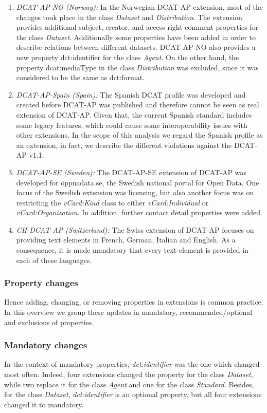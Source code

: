 \documentclass[<options>]{elsarticle}
\begin{document}
\begin{enumerate}
\item \textit{DCAT-AP-NO (Norway):} In the Norwegian DCAT-AP extension, most of the changes took place in the class \textit{Dataset} and \textit{Distribution}. The extension provides additional subject, creator, and access right comment properties for the class \textit{Dataset}. Additionally some properties have been added in order to describe relations between different datasets. DCAT-AP-NO also provides a new property dct:identifier for the class \textit{Agent}. On the other hand, the property dcat:mediaType in the class \textit{Distribution} was excluded, since it was considered to be the same as dct:format. 

\item \textit{DCAT-AP-Spain (Spain):} The Spanish DCAT profile was developed and created before DCAT-AP was published and therefore cannot be seen as real extension of DCAT-AP. Given that, the current Spanish standard includes some legacy features, which could cause some interoperability issues with other extensions. In the scope of this analysis we regard the Spanish profile as an extension, in fact, we describe the different violations against the DCAT-AP v1.1.

\item \textit{DCAT-AP-SE (Sweden):} The DCAT-AP-SE extension of DCAT-AP was developed for öppnadata.se, the Swedish national portal for Open Data. One focus of the Swedish extension was licensing, but also another focus was on restricting the \textit{vCard:Kind }class to either \textit{vCard:Individual} or \textit{vCard:Organization}. In addition, further contact detail properties were added. 

\item \textit{CH-DCAT-AP (Switzerland):} The Swiss extension of DCAT-AP focuses on providing text elements in French, German, Italian and English. As a consequence, it is made mandatory that every text element is provided in each of these languages. 
\end{enumerate}

\subsubsection{Property changes}
Hence adding, changing, or removing properties in extensions is common practice. In this overview we group these updates in mandatory, recommended/optional and exclusions of properties. 

\subsubsection*{Mandatory changes}
In the context of mandatory properties, \textit{dct:identifier} was the one which changed most often. Indeed, four extensions changed the property for the class \textit{Dataset}, while two replace it for the class \textit{Agent} and one for the class \textit{Standard}. Besides, for the class \textit{Dataset}, \textit{dct:identifier} is an optional property, but all four extensions changed it to mandatory.
\end{document}
